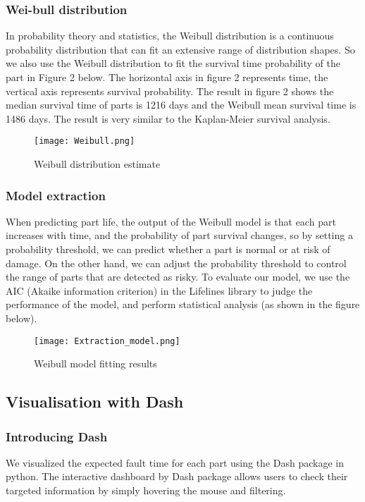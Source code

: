 \documentclass[11pt]{article}
\begin{document}
\subsubsection{Wei-bull distribution}
In probability theory and statistics, the Weibull distribution is a continuous probability distribution that can fit an extensive range of distribution shapes. So we also use the Weibull distribution to fit the survival time probability of the part in Figure 2 below. The horizontal axis in figure 2 represents time, the vertical axis represents survival probability. The result in figure 2 shows the median survival time of parts is 1216 days and the Weibull mean survival time is  1486 days. The result is very similar to the Kaplan-Meier survival analysis.

\begin{figure}[h]
\centering\texttt{[image: Weibull.png]} 
\caption{Weibull distribution estimate}
\end{figure}

\subsubsection{Model extraction}
When predicting part life, the output of the Weibull model is that each part increases with time, and the probability of part survival changes, so by setting a probability threshold, we can predict whether a part is normal or at risk of damage. On the other hand, we can adjust the probability threshold to control the range of parts that are detected as risky.
To evaluate our model, we use the AIC (Akaike information criterion) in the Lifelines library to judge the performance of the model, and perform statistical analysis (as shown in the figure below).

\begin{figure}[h]
\centering\texttt{[image: Extraction\_model.png]} 
\caption{Weibull model fitting results}
\end{figure}

\subsection{Visualisation with Dash}
\subsubsection{Introducing Dash}
We visualized the expected fault time for each part using the Dash package in python. The interactive dashboard by Dash package allows users to check their targeted information by simply hovering the mouse and filtering.
\end{document}
